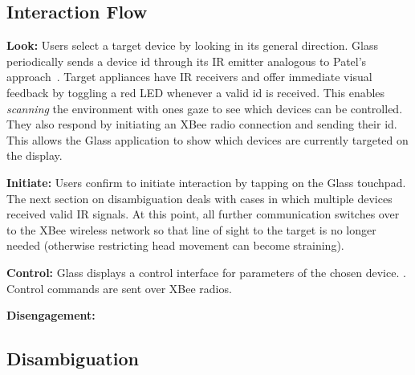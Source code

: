 \subsection{Interaction Flow}
{\bf Look:} Users select a target device by looking in its general direction.
Glass periodically sends a device id through its IR emitter analogous to Patel's approach~\cite{patel_2-way_2003}. Target appliances have IR receivers and offer immediate visual feedback by toggling a red LED whenever a valid id is received. This enables {\em scanning} the environment with ones gaze to see which devices can be controlled. They also respond by initiating an XBee radio connection and sending their id. This allows the Glass application to show which devices are currently targeted on the display. 

{\bf Initiate:} Users confirm to initiate interaction by tapping on the Glass touchpad. The next section on disambiguation deals with cases in which multiple devices received valid IR signals. At this point, all further communication switches over to the XBee wireless network so that line of sight to the target is no longer needed (otherwise restricting head movement can become straining).

{\bf Control:} Glass displays a control interface for parameters of the chosen device. .
Control commands are sent over XBee radios.

{\bf Disengagement:}  

\subsection{Disambiguation}

